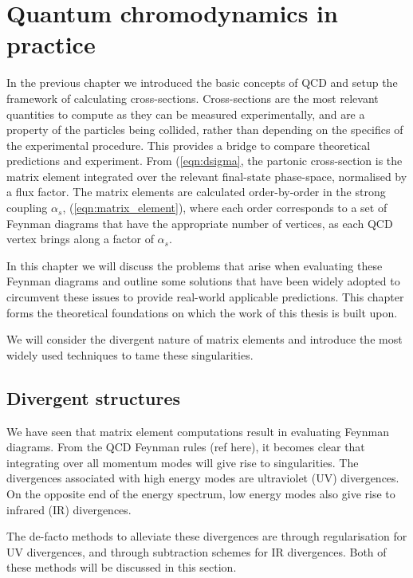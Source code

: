 \documentclass[main.tex]{subfiles}
\begin{document}
\chapter{Quantum chromodynamics in practice}
\label{chapter:qcd}
    In the previous chapter we introduced the basic concepts
    of QCD and setup the framework of calculating
    cross-sections. Cross-sections are the most relevant
    quantities to compute as they can be measured
    experimentally, and are a property of the particles
    being collided, rather than depending on the
    specifics of the experimental procedure.
    This provides a bridge to compare
    theoretical predictions and experiment.
    From (\ref{eqn:dsigma}, the partonic cross-section
    is the matrix element integrated over the relevant
    final-state phase-space, normalised by a flux factor.
    The matrix elements are
    calculated order-by-order in the strong coupling
    $\alpha_{s}$, (\ref{eqn:matrix_element}),
    where each order corresponds to a set of Feynman diagrams
    that have the appropriate number of vertices,
    as each QCD vertex brings along a factor of $\alpha_{s}$.

    In this chapter we will discuss the problems that
    arise when evaluating these Feynman diagrams and outline
    some solutions that have been widely adopted to circumvent
    these issues to provide real-world applicable predictions.
    This chapter forms the theoretical foundations on which
    the work of this thesis is built upon.

    We will consider the divergent nature of matrix
    elements and introduce the most widely used techniques
    to tame these singularities.

\section{Divergent structures}
    We have seen that matrix element computations
    result in evaluating Feynman diagrams. From
    the QCD Feynman rules (ref here), it becomes
    clear that integrating over all momentum modes
    will give rise to singularities. The divergences
    associated with high energy modes are ultraviolet
    (UV) divergences. On the opposite end of the energy
    spectrum, low energy modes also give rise to 
    infrared (IR) divergences.

    The de-facto methods to alleviate these
    divergences are through regularisation
    for UV divergences, and through subtraction
    schemes for IR divergences. Both of these
    methods will be discussed in this section.
\end{document}

